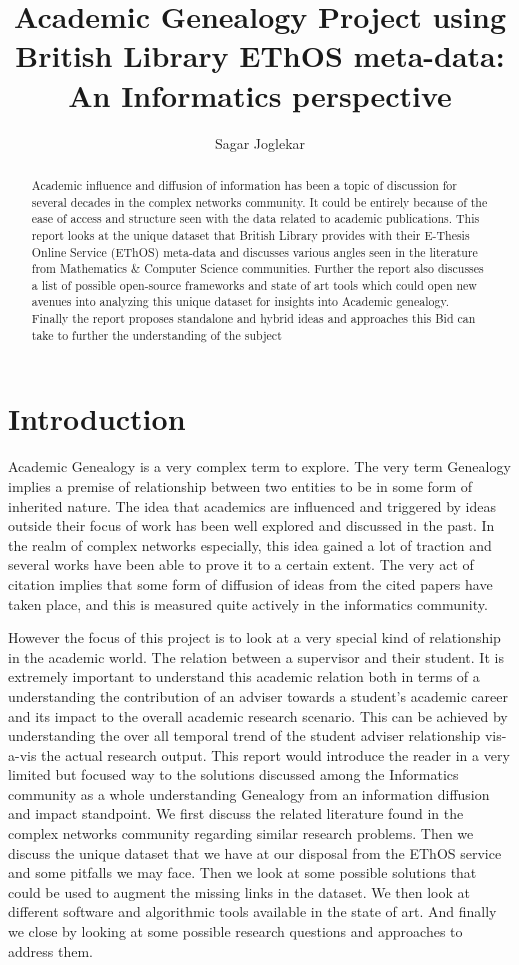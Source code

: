 \documentclass[a4paper]{article}
\title{Academic Genealogy Project using British Library EThOS meta-data: An Informatics perspective}
\author{Sagar Joglekar}
\begin{document}
\maketitle

\begin{abstract}
Academic influence and diffusion of information has been a topic of discussion for several decades in the complex networks community. It could be entirely because of the ease of access and structure seen with the data related to academic publications. This report looks at the unique dataset that British Library provides with their E-Thesis Online Service (EThOS) meta-data and discusses various angles seen in the literature from Mathematics \& Computer Science communities. Further the report also discusses a list of possible open-source frameworks and state of art tools which could open new avenues into analyzing this unique dataset for insights into Academic genealogy. Finally the report proposes standalone and hybrid ideas and approaches this Bid can take to further the understanding of the subject
\end{abstract}

\section{Introduction}

Academic Genealogy is a very complex term to explore. The very term Genealogy implies a premise of relationship between two entities to be in some form of inherited nature. The idea that academics are influenced and triggered by ideas outside their focus of work has been well explored and discussed in the past. In the realm of complex networks especially, this idea gained a lot of traction and several works have been able to prove it to a certain extent. The very act of citation implies that some form of diffusion of ideas from the cited papers have taken place, and this is measured quite actively in the informatics community. 
\par
However the focus of this project is to look at a very special kind of relationship in the academic world. The relation between a supervisor and their student. It is extremely important to understand this academic relation both in terms of a understanding the contribution of an adviser towards a student's academic career and its impact to the overall academic research scenario. This can be achieved by understanding the over all temporal trend of the student adviser relationship vis-a-vis the actual research output.
This report would introduce the reader in a very limited but focused way to the solutions discussed among the Informatics community as a whole understanding Genealogy from an information diffusion and impact standpoint. We first discuss the related literature found in the complex networks community regarding similar research problems. Then we discuss the unique dataset that we have at our disposal from the EThOS service and some pitfalls we may face. Then we look at some possible solutions that could be used to augment the missing links in the dataset. We then look at different software and algorithmic tools available in the state of art. And finally we close by looking at some possible research questions and approaches to address them.
\end{document}
